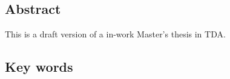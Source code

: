 \subsection*{Abstract}
This is a draft version of a in-work Master's thesis in TDA.


\subsection*{Key words}
